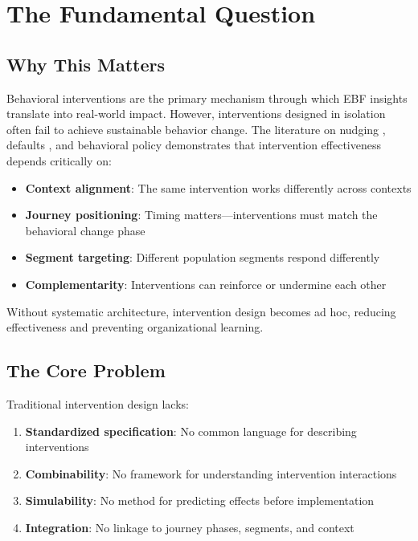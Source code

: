 
\section{The Fundamental Question}
\label{sec:hhh-fundamental}

\subsection{Why This Matters}

Behavioral interventions are the primary mechanism through which EBF insights translate into real-world impact. However, interventions designed in isolation often fail to achieve sustainable behavior change. The literature on nudging \citep{thalersunstein2008}, defaults \citep{madrian2001}, and behavioral policy \citep{dolan2012} demonstrates that intervention effectiveness depends critically on:

\begin{itemize}
\item \textbf{Context alignment}: The same intervention works differently across contexts
\item \textbf{Journey positioning}: Timing matters---interventions must match the behavioral change phase
\item \textbf{Segment targeting}: Different population segments respond differently
\item \textbf{Complementarity}: Interventions can reinforce or undermine each other
\end{itemize}

Without systematic architecture, intervention design becomes ad hoc, reducing effectiveness and preventing organizational learning.

\subsection{The Core Problem}

Traditional intervention design lacks:
\begin{enumerate}
\item \textbf{Standardized specification}: No common language for describing interventions
\item \textbf{Combinability}: No framework for understanding intervention interactions
\item \textbf{Simulability}: No method for predicting effects before implementation
\item \textbf{Integration}: No linkage to journey phases, segments, and context
\end{enumerate}

